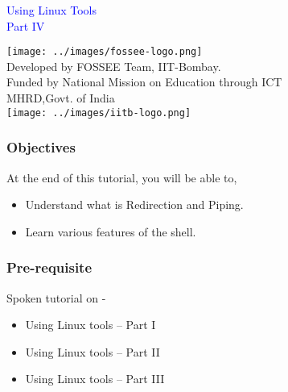 \documentclass[12pt,compress]{beamer}
\begin{document}
\begin{frame}

\begin{center}
\vspace{12pt}
\textcolor{blue}{\huge Using Linux Tools\\Part IV}
\end{center}
\vspace{18pt}
\begin{center}
\vspace{10pt}
\texttt{[image: ../images/fossee-logo.png]}\\
\vspace{5pt}
\scriptsize Developed by FOSSEE Team, IIT-Bombay. \\ 
\scriptsize Funded by National Mission on Education through ICT\\
\scriptsize  MHRD,Govt. of India\\
\texttt{[image: ../images/iitb-logo.png]}\\
\end{center}
\end{frame}
\begin{frame}
\frametitle{Objectives}
\label{sec-2}

At the end of this tutorial, you will be able to,
\begin{itemize}
\item Understand what is Redirection and Piping.
\item Learn various features of the shell.
\end{itemize}
\end{frame}

\begin{frame}
\frametitle{Pre-requisite}
\label{sec-3}

Spoken tutorial on -
\begin{itemize}
\item Using Linux tools -- Part I
\item Using Linux tools -- Part II
\item Using Linux tools -- Part III
\end{itemize}
\end{frame}
\end{document}
